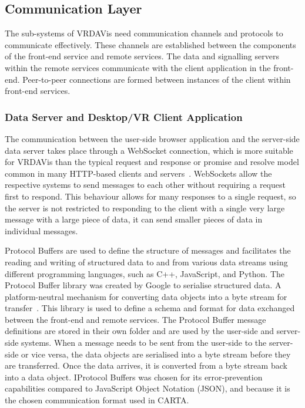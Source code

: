 \subsection{Communication Layer}
\label{sec:communication-layer}
The sub-systems of VRDAVis need communication channels and protocols to communicate effectively.
These channels are established between the components of the front-end service and remote services. 
The data and signalling servers within the remote services communicate with the client application in the front-end. 
Peer-to-peer connections are formed between instances of the client within front-end services. 

\subsubsection{Data Server and Desktop/VR Client Application}
The communication between the user-side browser application and the server-side data server takes place through a WebSocket connection, which is more suitable for VRDAVis than the typical request and response or promise and resolve model common in many HTTP-based clients and servers~\cite{MDN_WebSockets_API}.
WebSockets allow the respective systems to send messages to each other without requiring a request first to respond. 
This behaviour allows for many responses to a single request, 
so the server is not restricted to responding to the client with a single very large message with a large piece of data, it can send smaller pieces of data in individual messages.

Protocol Buffers are used to define the structure of messages and facilitates the reading and writing of structured data to and from various data streams using different programming languages, such as C++, JavaScript, and Python.
The Protocol Buffer library was created by Google to serialise structured data. 
A platform-neutral mechanism for converting data objects into a byte stream for transfer~\cite{Google_Protocol_Buffers}.
This library is used to define a schema and format for data exchanged between the front-end and remote services. 
The Protocol Buffer message definitions are stored in their own folder and are used by the user-side and server-side systems. 
When a message needs to be sent from the user-side to the server-side or vice versa, the data objects are serialised into a byte stream before they are transferred. 
Once the data arrives, it is converted from a byte stream back into a data object.
IProtocol Buffers was chosen for its error-prevention capabilities compared to JavaScript Object Notation (JSON), and because it is the chosen communication format used in CARTA.

